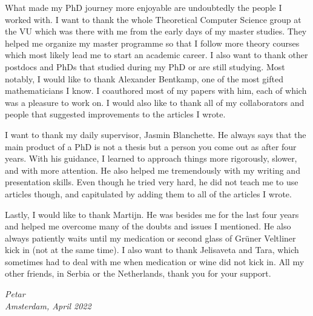 What made my PhD journey more enjoyable are undoubtedly the people I worked
with. I want to thank the whole Theoretical Computer Science group at the VU
which was there with me from the early days of my master studies. They helped me
organize my master programme so that I follow more theory courses which most
likely lead  me to start an academic career. I also want to thank other postdocs
and PhDs that studied during my PhD or are still studying. Most notably, I would
like to thank Alexander Bentkamp, one of the most gifted mathematicians I know.
I coauthored most of my papers with him, each of which was a pleasure to work
on. I would also like to thank all of my collaborators and people that suggested
improvements to the articles I wrote.

I want to thank my daily supervisor, Jasmin Blanchette. He always says that
the main product of a PhD is not a thesis but a person you come out as after four
years. With his guidance, I learned to approach things more rigorously, slower,
and with more attention. He also helped me tremendously  with my writing and
presentation skills. Even though he tried very hard, he did not teach me to use 
articles though, and capitulated by adding them to all of the articles I wrote.

Lastly, I would like to thank Martijn. He was besides me for the last four years
and helped me overcome many of the doubts and issues I mentioned. He also always
patiently waits until my medication or second glass of Grüner Veltliner kick in
(not at the same time). I also want to thank Jelisaveta and Tara, which
sometimes had to deal with me when medication or wine did not kick in. All my other friends,
in Serbia or the Netherlands, thank you for your support.

 

\begin{flushright}
{\makeatletter\itshape
    Petar \\
    Amsterdam, April 2022
\makeatother}
\end{flushright}


